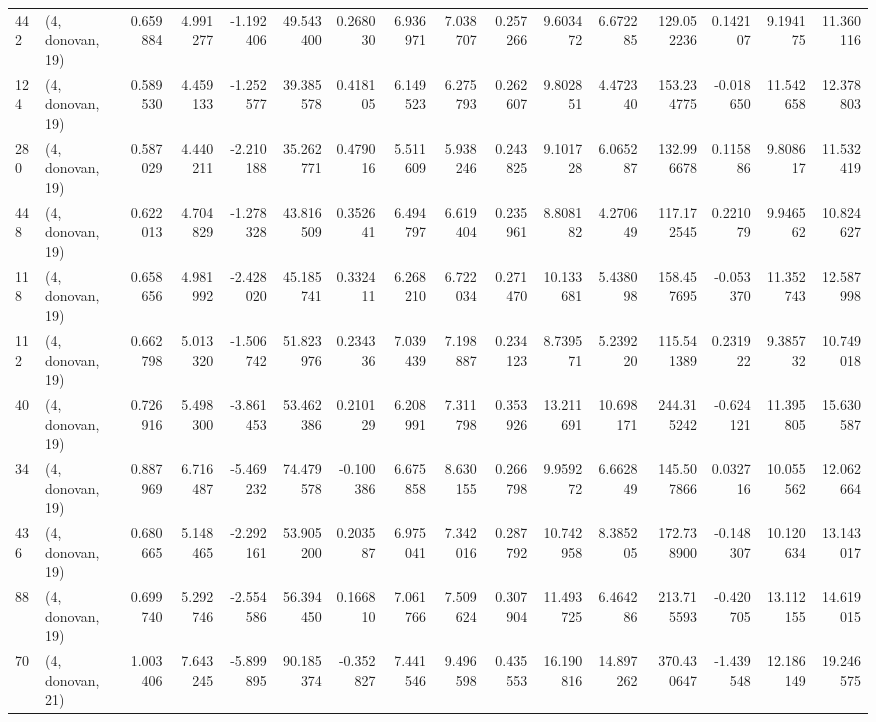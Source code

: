 \begin{tabular}{llrrrrrrrrrrrrrr}
442 &  (4, donovan, 19) &   0.659884 &   4.991277 &  -1.192406 &    49.543400 &   0.268030 &   6.936971 &   7.038707 &  0.257266 &   9.603472 &   6.672285 &   129.052236 &   0.142107 &   9.194175 &  11.360116 \\
124 &  (4, donovan, 19) &   0.589530 &   4.459133 &  -1.252577 &    39.385578 &   0.418105 &   6.149523 &   6.275793 &  0.262607 &   9.802851 &   4.472340 &   153.234775 &  -0.018650 &  11.542658 &  12.378803 \\
280 &  (4, donovan, 19) &   0.587029 &   4.440211 &  -2.210188 &    35.262771 &   0.479016 &   5.511609 &   5.938246 &  0.243825 &   9.101728 &   6.065287 &   132.996678 &   0.115886 &   9.808617 &  11.532419 \\
448 &  (4, donovan, 19) &   0.622013 &   4.704829 &  -1.278328 &    43.816509 &   0.352641 &   6.494797 &   6.619404 &  0.235961 &   8.808182 &   4.270649 &   117.172545 &   0.221079 &   9.946562 &  10.824627 \\
118 &  (4, donovan, 19) &   0.658656 &   4.981992 &  -2.428020 &    45.185741 &   0.332411 &   6.268210 &   6.722034 &  0.271470 &  10.133681 &   5.438098 &   158.457695 &  -0.053370 &  11.352743 &  12.587998 \\
112 &  (4, donovan, 19) &   0.662798 &   5.013320 &  -1.506742 &    51.823976 &   0.234336 &   7.039439 &   7.198887 &  0.234123 &   8.739571 &   5.239220 &   115.541389 &   0.231922 &   9.385732 &  10.749018 \\
40  &  (4, donovan, 19) &   0.726916 &   5.498300 &  -3.861453 &    53.462386 &   0.210129 &   6.208991 &   7.311798 &  0.353926 &  13.211691 &  10.698171 &   244.315242 &  -0.624121 &  11.395805 &  15.630587 \\
34  &  (4, donovan, 19) &   0.887969 &   6.716487 &  -5.469232 &    74.479578 &  -0.100386 &   6.675858 &   8.630155 &  0.266798 &   9.959272 &   6.662849 &   145.507866 &   0.032716 &  10.055562 &  12.062664 \\
436 &  (4, donovan, 19) &   0.680665 &   5.148465 &  -2.292161 &    53.905200 &   0.203587 &   6.975041 &   7.342016 &  0.287792 &  10.742958 &   8.385205 &   172.738900 &  -0.148307 &  10.120634 &  13.143017 \\
88  &  (4, donovan, 19) &   0.699740 &   5.292746 &  -2.554586 &    56.394450 &   0.166810 &   7.061766 &   7.509624 &  0.307904 &  11.493725 &   6.464286 &   213.715593 &  -0.420705 &  13.112155 &  14.619015 \\
70  &  (4, donovan, 21) &   1.003406 &   7.643245 &  -5.899895 &    90.185374 &  -0.352827 &   7.441546 &   9.496598 &  0.435553 &  16.190816 &  14.897262 &   370.430647 &  -1.439548 &  12.186149 &  19.246575 \\

\end{tabular}
